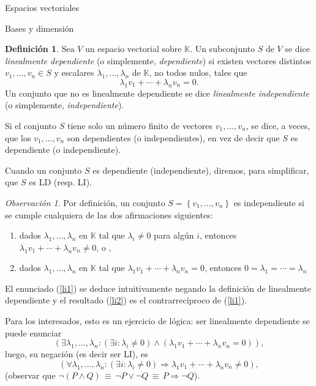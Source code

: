 \documentclass[a4paper,12pt,twoside,spanish]{amsbook}
\theoremstyle{definition}
\newtheorem{definicion}{Definici\'on}[section]
\theoremstyle{remark}
\newtheorem{observacion}{Observaci\'on}[section]
\newcommand{\K}{\mathbb K}
\begin{document}
\begin{chapter}{Espacios vectoriales}
\begin{section}{Bases y dimensión}
	\begin{definicion}
		Sea $V$ un espacio vectorial sobre $\K$. Un subconjunto $S$ de $V$ se dice \textit{linealmente dependiente} (o simplemente, \textit{dependiente}) si existen vectores distintos $v_1,\ldots,v_n \in S$  y escalares $\lambda_1,\ldots,\lambda_n$ de $\K$, no todos nulos, tales que 	
		\begin{equation*}
			\lambda_1v_1+\cdots+\lambda_nv_n=0.
		\end{equation*}
		Un conjunto que no es linealmente dependiente se dice \textit{linealmente independiente} (o simplemente, \textit{independiente}).
		
		Si el conjunto $S$ tiene solo un número finito de vectores $v_1,\ldots,v_n$, se dice,
		a veces, que los $v_1,\ldots,v_n$ son dependientes (o independientes), en vez de decir
		que $S$ es dependiente (o independiente).
		
		Cuando un conjunto $S$ es dependiente (independiente), diremos,  para simplificar,  que $S$ es LD (resp. LI).
	\end{definicion}

\begin{observacion} Por definición, un conjunto $S = \left\{v_1,\ldots,v_n \right\}$ es independiente si se cumple cualquiera de las dos afirmaciones siguientes:
	\begin{enumerate}[label=(\alph*),ref=\alph*]
		\item\label{li1} dados $\lambda_1,\ldots,\lambda_n$ en $\K$ tal que $\lambda_i \ne 0$ para algún $i$,  entonces  $\lambda_1v_1+\cdots+\lambda_nv_n\not=0$, o ,
		\item \label{li2}dados $\lambda_1,\ldots,\lambda_n$ en $\K$ tal que $\lambda_1v_1+\cdots+\lambda_nv_n=0$,  entonces $0=\lambda_1=\cdots=\lambda_n$
	\end{enumerate}
	El enunciado (\ref{li1}) se deduce intuitivamente negando  la definición de linealmente dependiente y el resultado (\ref{li2}) es el contrarrecíproco  de (\ref{li1}).
	
	
Para los interesados, esto es un ejercicio de lógica: ser linealmente dependiente se puede enunciar 
$$
(\exists \lambda_1,\ldots,\lambda_n: (\exists i: \lambda_i \ne 0) \wedge (\lambda_1v_1+\cdots+\lambda_nv_n=0 )),
$$
luego, su negación  (es decir ser LI), es 
$$
(\forall \lambda_1,\ldots,\lambda_n:  (\exists i: \lambda_i \ne 0) \Rightarrow \lambda_1v_1+\cdots+\lambda_nv_n\ne 0),
$$
(observar  que $\neg(P \wedge Q) \,\equiv\, \neg P \vee \neg Q \,\equiv\, P \Rightarrow \neg Q$). 


\end{observacion}
\end{section}
\end{chapter}
\end{document}
